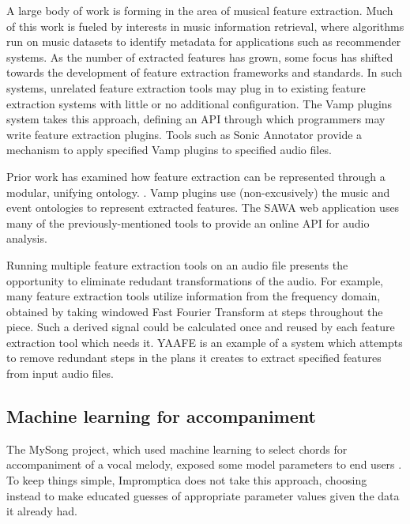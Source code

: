 \documentclass[11pt,conference,letterpaper]{IEEEtran}
\begin{document}
A large body of work is forming in the area of musical feature extraction. Much of this work is fueled by interests in music information retrieval, where algorithms run on music datasets to identify metadata for applications such as recommender systems. As the number of extracted features has grown, some focus has shifted towards the development of feature extraction frameworks and standards. In such systems, unrelated feature extraction tools may plug in to existing feature extraction systems with little or no additional configuration. The Vamp plugins system takes this approach, defining an API through which programmers may write feature extraction plugins. Tools such as Sonic Annotator provide a mechanism to apply specified Vamp plugins to specified audio files.

Prior work has examined how feature extraction can be represented through a modular, unifying ontology. \cite{raimond2008web}. Vamp plugins use (non-excusively) the music \cite{raimond2007music} and event \cite{raimond2007event} ontologies to represent extracted features. The SAWA web application \cite{fazekas2009reusable} uses many of the previously-mentioned tools to provide an online API for audio analysis.


Running multiple feature extraction tools on an audio file presents the opportunity to eliminate redudant transformations of the audio. For example, many feature extraction tools utilize information from the frequency domain, obtained by taking windowed Fast Fourier Transform at steps throughout the piece. Such a derived signal could be calculated once and reused by each feature extraction tool which needs it. YAAFE \cite{mathieu2010yaafe} is an example of a system which attempts to remove redundant steps in the plans it creates to extract specified features from input audio files.

\subsection{Machine learning for accompaniment}

The MySong project, which used machine learning to select chords for accompaniment of a vocal melody, exposed some model parameters to end users \cite{morris2008exposing}. To keep things simple, Impromptica does not take this approach, choosing instead to make educated guesses of appropriate parameter values given the data it already had.
\end{document}
